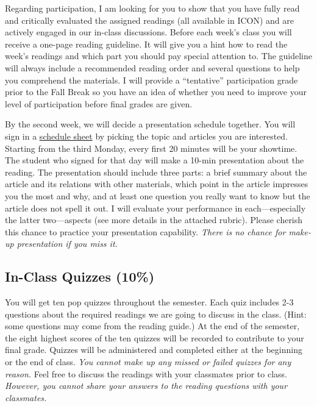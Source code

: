 \documentclass[11pt,]{article}
\theoremstyle{definition}
\theoremstyle{definition}
\theoremstyle{remark}
\begin{document}
Regarding participation, I am looking for you to show that you have
fully read and critically evaluated the assigned readings (all available
in ICON) and are actively engaged in our in-class discussions. Before
each week's class you will receive a one-page reading guideline. It will
give you a hint how to read the week's readings and which part you
should pay special attention to. The guideline will always include a
recommended reading order and several questions to help you comprehend
the materials. I will provide a ``tentative'' participation grade prior
to the Fall Break so you have an idea of whether you need to improve
your level of participation before final grades are given.

By the second week, we will decide a presentation schedule together. You
will sign in a
\href{https://docs.google.com/spreadsheets/d/1s7WX9B5ePwlLhyOlqV_XBHU6lFmbHsyClbAOLV5Jaek/edit?usp=sharing}{schedule
sheet} by picking the topic and articles you are interested. Starting
from the third Monday, every first 20 minutes will be your showtime. The
student who signed for that day will make a 10-min presentation about
the reading. The presentation should include three parts: a brief
summary about the article and its relations with other materials, which
point in the article impresses you the most and why, and at least one
question you really want to know but the article does not spell it out.
I will evaluate your performance in each---especially the latter
two---aspects (see more details in the attached rubric). Please cherish
this chance to practice your presentation capability. \emph{There is no
chance for make-up presentation if you miss it.}

\subsection{In-Class Quizzes (10\%)}\label{in-class-quizzes-10}

You will get ten pop quizzes throughout the semester. Each quiz includes
2-3 questions about the required readings we are going to discuss in the
class. (Hint: some questions may come from the reading guide.) At the
end of the semester, the eight highest scores of the ten quizzes will be
recorded to contribute to your final grade. Quizzes will be administered
and completed either at the beginning or the end of class. \emph{You
cannot make up any missed or failed quizzes for any reason.} Feel free
to discuss the readings with your classmates prior to class.
\emph{However, you cannot share your answers to the reading questions
with your classmates.}
\end{document}
